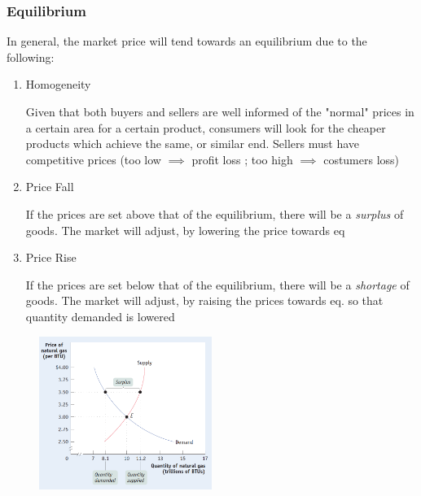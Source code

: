 \documentclass[english,course]{Notes}
\newcommand{\ita}[1]{\textit{#1}}
\begin{document}
\subsubsection{Equilibrium}




\par{In general, the market price will tend towards an equilibrium due to the following:}

\begin{enumerate}

\item Homogeneity

	\par{Given that both buyers and sellers are well informed of the "normal" prices in a certain area for a certain product, consumers will look for the cheaper products which achieve the same, or similar end. Sellers must have competitive prices (too low $\implies$ profit loss ; too high $\implies$ costumers loss)}
	
\item Price Fall

	\par{If the prices are set above that of the equilibrium, there will be a \ita{surplus} of goods. The market will adjust, by lowering the price towards eq}
	
	
\item Price Rise

	\par{If the prices are set below that of the equilibrium, there will be a \ita{shortage} of goods. The market will adjust, by raising the prices towards eq. so that quantity demanded is lowered}
	
\end{enumerate}

\begin{figure}[ht]
\centering
\includegraphics[width=0.5\textwidth]{supplySurplus}
\end{figure}
\end{document}
